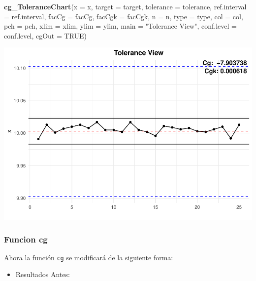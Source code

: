 \documentclass[
]{book}
\newenvironment{Shaded}{\begin{snugshade}}{\end{snugshade}}
\newcommand{\AttributeTok}[1]{\textcolor[rgb]{0.13,0.29,0.53}{#1}}
\newcommand{\ConstantTok}[1]{\textcolor[rgb]{0.56,0.35,0.01}{#1}}
\newcommand{\FunctionTok}[1]{\textcolor[rgb]{0.13,0.29,0.53}{\textbf{#1}}}
\newcommand{\NormalTok}[1]{#1}
\newcommand{\StringTok}[1]{\textcolor[rgb]{0.31,0.60,0.02}{#1}}
\providecommand{\tightlist}{%
  \setlength{\itemsep}{0pt}\setlength{\parskip}{0pt}}
\begin{document}
\begin{Shaded}
\begin{Highlighting}[]
\FunctionTok{cg\_ToleranceChart}\NormalTok{(}\AttributeTok{x =}\NormalTok{ x, }\AttributeTok{target =}\NormalTok{ target, }\AttributeTok{tolerance =}\NormalTok{ tolerance, }
                 \AttributeTok{ref.interval =}\NormalTok{ ref.interval, }\AttributeTok{facCg =}\NormalTok{ facCg, }\AttributeTok{facCgk =}\NormalTok{ facCgk, }
                 \AttributeTok{n =}\NormalTok{ n, }\AttributeTok{type =}\NormalTok{ type, }\AttributeTok{col =}\NormalTok{ col, }\AttributeTok{pch =}\NormalTok{ pch, }\AttributeTok{xlim =}\NormalTok{ xlim, }
                 \AttributeTok{ylim =}\NormalTok{ ylim, }\AttributeTok{main =} \StringTok{"Tolerance View"}\NormalTok{, }\AttributeTok{conf.level =}\NormalTok{ conf.level, }\AttributeTok{cgOut =} \ConstantTok{TRUE}\NormalTok{)}
\end{Highlighting}
\end{Shaded}

\includegraphics{Libro_TidyQualityTools_files/figure-latex/unnamed-chunk-151-1.pdf}

\hypertarget{funcion-cg}{%
\subsubsection{Funcion cg}\label{funcion-cg}}

Ahora la función \texttt{cg} se modificará de la siguiente forma:

\begin{itemize}
\tightlist
\item
  Resultados Antes:
\end{itemize}
\end{document}
